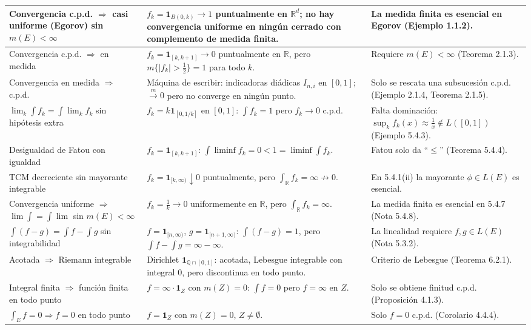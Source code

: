 \documentclass[11pt,twoside]{article}
\newcommand{\R}{\mathbb{R}}
\newcommand{\Q}{\mathbb{Q}}
\newcommand{\ind}{\mathbf{1}}
\begin{document}
\begin{longtable}{p{} p{} p{}}
Convergencia c.p.d. $\Rightarrow$ casi uniforme (Egorov) sin $m(E) < \infty$ & $f_{k} = \ind_{B(0,k)} \to 1$ puntualmente en $\R^{d}$; no hay convergencia uniforme en ningún cerrado con complemento de medida finita. & La medida finita es esencial en Egorov (Ejemplo 1.1.2). \\
\hline
Convergencia c.p.d. $\Rightarrow$ en medida & $f_{k} = \ind_{[k,k+1]} \to 0$ puntualmente en $\R$, pero $m\{|f_{k}| > \tfrac{1}{2}\} = 1$ para todo $k$. & Requiere $m(E) < \infty$ (Teorema 2.1.3). \\
\hline
Convergencia en medida $\Rightarrow$ c.p.d. & Máquina de escribir: indicadoras diádicas $I_{n,i}$ en $[0,1]$; $\xrightarrow{m} 0$ pero no converge en ningún punto. & Solo se rescata una subsucesión c.p.d. (Ejemplo 2.1.4, Teorema 2.1.5). \\
\hline
$\lim_{k} \int f_{k} = \int \lim_{k} f_{k}$ sin hipótesis extra & $f_{k} = k \ind_{[0,1/k]}$ en $[0,1]$: $\int f_{k} = 1$ pero $f_{k} \to 0$ c.p.d. & Falta dominación: $\sup_{k} f_{k}(x) \approx \tfrac{1}{x} \notin L([0,1])$ (Ejemplo 5.4.3). \\
\hline
Desigualdad de Fatou con igualdad & $f_{k} = \ind_{[k,k+1]}$: $\int \liminf f_{k} = 0 < 1 = \liminf \int f_{k}$. & Fatou solo da ``$\leq$'' (Teorema 5.4.4). \\
\hline
TCM decreciente sin mayorante integrable & $f_{k} = \ind_{[k,\infty)} \downarrow 0$ puntualmente, pero $\int_{\R} f_{k} = \infty \not\to 0$. & En 5.4.1(ii) la mayorante $\phi \in L(E)$ es esencial. \\
\hline
Convergencia uniforme $\Rightarrow$ $\lim \int = \int \lim$ sin $m(E) < \infty$ & $f_{k} = \tfrac{1}{k} \to 0$ uniformemente en $\R$, pero $\int_{\R} f_{k} = \infty$. & La medida finita es esencial en 5.4.7 (Nota 5.4.8). \\
\hline
$\int (f - g) = \int f - \int g$ sin integrabilidad & $f = \ind_{[n,\infty)}$, $g = \ind_{[n+1,\infty)}$: $\int (f-g) = 1$, pero $\int f - \int g = \infty - \infty$. & La linealidad requiere $f, g \in L(E)$ (Nota 5.3.2). \\
\hline
Acotada $\Rightarrow$ Riemann integrable & Dirichlet $\ind_{\Q \cap [0,1]}$: acotada, Lebesgue integrable con integral $0$, pero discontinua en todo punto. & Criterio de Lebesgue (Teorema 6.2.1). \\
\hline
Integral finita $\Rightarrow$ función finita en todo punto & $f = \infty \cdot \ind_{Z}$ con $m(Z) = 0$: $\int f = 0$ pero $f = \infty$ en $Z$. & Solo se obtiene finitud c.p.d. (Proposición 4.1.3). \\
\hline
$\int_{E} f = 0 \Rightarrow f = 0$ en todo punto & $f = \ind_{Z}$ con $m(Z) = 0$, $Z \neq \emptyset$. & Solo $f = 0$ c.p.d. (Corolario 4.4.4). \\
\hline
\end{longtable}
\renewcommand{\arraystretch}{1.0}
\newpage
\end{document}
